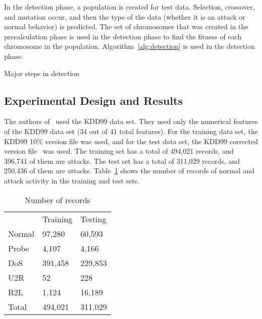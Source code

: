 \documentclass{sig-alternate}
\begin{document}
In the detection phase, a population is created for test data. Selection, crossover, and mutation occur, and then the type of the data (whether it is an attack or normal behavior) is predicted. The set of chromosomes that was created in the precalculation phase is used in the detection phase to find the fitness of each chromosome in the population. Algorithm~\ref{alg:detection} is used in the detection phase.

\begin{algorithm}
\caption{Major steps in detection}
\label{alg:detection}
\begin{algorithmic}
    \ENDFOR
  \ENDFOR
\ENDWHILE
\end{algorithmic}
\end{algorithm}




\subsection{Experimental Design and Results}
The authors of~\cite{DBLP:journals/corr/abs-1204-1336} used the KDD99 data set. They used only the numerical features of the KDD99 data set (34 out of 41 total features). For the training data set, the KDD99 10\% version file was used, and for the test data set, the KDD99 corrected version file~\cite{KDD99} was used. The training set has a total of 494,021 records, and 396,741 of them are attacks. The test set has a total of 311,029 records, and 250,436 of them are attacks. Table~\ref{tab:numberOfRecords} shows the number of records of normal and attack activity in the training and test sets.

\begin{table}
\center
\caption{Number of records}
\vspace{0.20cm}
\begin{tabular}{lll}
  & Training & Testing \\ 
Normal & 97,280 & 60,593\\
Probe  & 4,107  & 4,166\\
DoS	   & 391,458 & 229,853\\
U2R    & 52      & 228\\
R2L    & 1,124   & 16,189\\
Total  & 494,021 & 311,029\\
\end{tabular}
\center
\label{tab:numberOfRecords}
\end{table}
\end{document}
